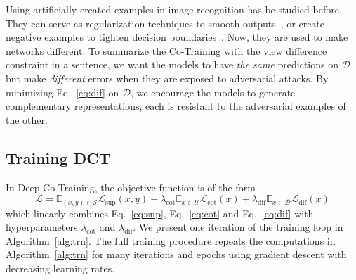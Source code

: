 \documentclass[runningheads]{llncs}
\begin{document}
Using artificially created examples in image recognition has be studied before.
They can serve as regularization techniques to smooth outputs~\cite{vat}, or create negative examples to tighten decision boundaries~\cite{badgan,intro_cnn}.
Now, they are used to make networks different.
To summarize the Co-Training with the view difference constraint in a sentence, we want the models to have \emph{the same} predictions on $\mathcal{D}$ but make \emph{different} errors when they are exposed to adversarial attacks.
By minimizing Eq.~\ref{eq:dif} on $\mathcal{D}$, we encourage the models to generate complementary representations, each is resistant to the adversarial examples of the other.

\subsection{Training DCT}
In Deep Co-Training, the objective function is of the form
\begin{equation}\label{eq:los}
  \mathcal{L} = \mathbb{E}_{(x, y)\in\mathcal{S}}\mathcal{L}_{\text{sup}}(x, y) + \lambda_{\text{cot}}\mathbb{E}_{x\in\mathcal{U}}\mathcal{L}_{\text{cot}}(x) +
  \lambda_{\text{dif}}\mathbb{E}_{x\in\mathcal{D}}\mathcal{L}_{\text{dif}}(x)
\end{equation}
which linearly combines Eq.~\ref{eq:sup}, Eq.~\ref{eq:cot} and Eq.~\ref{eq:dif} with hyperparameters $\lambda_{\text{cot}}$ and $\lambda_{\text{dif}}$.
We present one iteration of the training loop in Algorithm~\ref{alg:trn}.
The full training procedure repeats the computations in Algorithm~\ref{alg:trn} for many iterations and epochs using gradient descent with decreasing learning rates.
\end{document}
